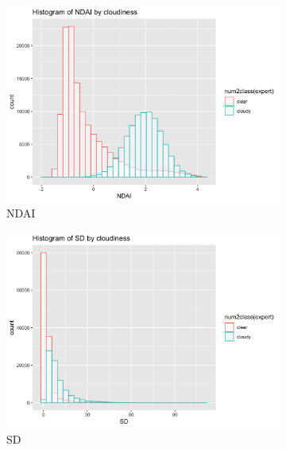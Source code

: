 \documentclass[jou]{apa}%
\begin{document}
\begin{figure}[H]
\hspace*{-.5cm}\begin{subfigure}{0.4\columnwidth}
    \includegraphics[scale=.1]{NDAI}
    \caption{NDAI}
    \label{fig:1}
  \end{subfigure}\hfill
\begin{subfigure}{0.4\columnwidth} \hspace*{-1cm}
    \includegraphics[scale=.1]{SD}
    \caption{SD}
    \label{fig:2}
  \end{subfigure}
  \begin{subfigure}{0.4\columnwidth} \hspace*{-0.5cm}

\end{subfigure}
\end{figure}
\end{document}
